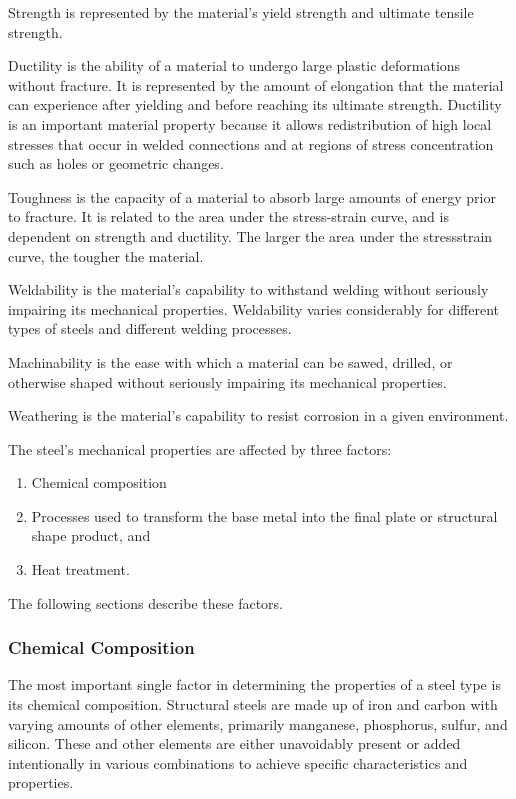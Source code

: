 Strength is represented by the material’s yield strength and ultimate tensile strength.

Ductility is the ability of a material to undergo large plastic deformations without fracture. It is represented by the amount of elongation that the material can experience after yielding and before reaching its ultimate strength. Ductility is an important material property because it allows redistribution of high local stresses that occur in welded connections and at regions of stress concentration such as holes or geometric changes.

Toughness is the capacity of a material to absorb large amounts of energy prior to fracture. It is related to the area under the stress-strain curve, and is dependent on strength and ductility. The larger the area under the stressstrain curve, the tougher the material.

Weldability is the material’s capability to withstand welding without seriously impairing its mechanical properties. Weldability varies considerably for different types of steels and different welding processes.

Machinability is the ease with which a material can be sawed, drilled, or otherwise shaped without seriously impairing its mechanical properties.

Weathering is the material’s capability to resist corrosion in a given environment.

The steel’s mechanical properties are affected by three factors:
\begin{enumerate}
  \item Chemical composition
  \item Processes used to transform the base metal into the final plate or structural shape product, and
  \item Heat treatment.
\end{enumerate}

The following sections describe these factors.

\subsubsection{Chemical Composition}
The most important single factor in determining the properties of a steel type is its chemical composition. Structural steels are made up of iron and carbon with varying amounts of other elements, primarily manganese, phosphorus, sulfur, and silicon. These and other elements are either unavoidably present or added intentionally in various combinations to achieve specific characteristics and properties.

